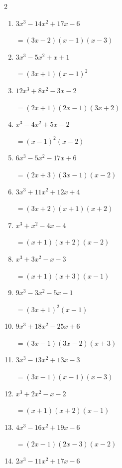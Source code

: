 \begin{multicols}{2}
\begin{enumerate}
  \item $3x^{3}-14x^{2}+17x-6$

        $=(3x-2)(x-1)(x-3)$

  \item $3x^{3}-5x^{2}+x+1$

        $=(3x+1)(x-1) ^{ 2 }$

  \item $12x^{3}+8x^{2}-3x-2$

        $=(2x+1)(2x-1)(3x+2)$

  \item $x^{3}-4x^{2}+5x-2$

        $=(x-1) ^{ 2 }(x-2)$

  \item $6x^{3}-5x^{2}-17x+6$

        $=(2x+3)(3x-1)(x-2)$

\columnbreak %

  \item $3x^{3}+11x^{2}+12x+4$

        $=(3x+2)(x+1)(x+2)$

  \item $x^{3}+x^{2}-4x-4$

        $=(x+1)(x+2)(x-2)$

  \item $x^{3}+3x^{2}-x-3$

        $=(x+1)(x+3)(x-1)$

  \item $9x^{3}-3x^{2}-5x-1$

        $=(3x+1) ^{ 2 }(x-1)$

  \item $9x^{3}+18x^{2}-25x+6$

        $=(3x-1)(3x-2)(x+3)$

\columnbreak %

\resetques

  \item $3x^{3}-13x^{2}+13x-3$

        $=(3x-1)(x-1)(x-3)$

  \item $x^{3}+2x^{2}-x-2$

        $=(x+1)(x+2)(x-1)$

  \item $4x^{3}-16x^{2}+19x-6$

        $=(2x-1)(2x-3)(x-2)$

  \item $2x^{3}-11x^{2}+17x-6$


\end{enumerate}
\end{multicols}
